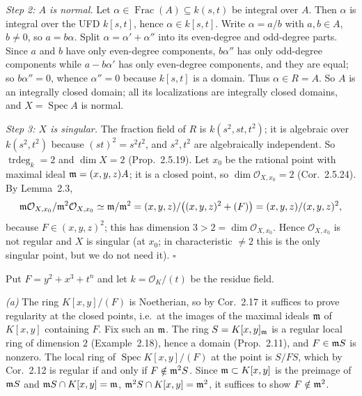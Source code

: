 \documentclass[11pt]{article}
\begin{document}
\emph{Step 2: $A$ is normal.} Let $\alpha\in\operatorname{Frac}(A)\subseteq k(s,t)$ be integral over $A$. Then $\alpha$ is integral over the UFD $k[s,t]$, hence $\alpha\in k[s,t]$. Write $\alpha=a/b$ with $a,b\in A$, $b\ne0$, so $a=b\alpha$. Split $\alpha=\alpha'+\alpha''$ into its even-degree and odd-degree parts. Since $a$ and $b$ have only even-degree components, $b\alpha''$ has only odd-degree components while $a-b\alpha'$ has only even-degree components, and they are equal; so $b\alpha''=0$, whence $\alpha''=0$ because $k[s,t]$ is a domain. Thus $\alpha\in R=A$. So $A$ is an integrally closed domain; all its localizations are integrally closed domains, and $X=\operatorname{Spec}A$ is normal.

\emph{Step 3: $X$ is singular.} The fraction field of $R$ is $k(s^2,st,t^2)$; it is algebraic over $k(s^2,t^2)$ because $(st)^2=s^2t^2$, and $s^2,t^2$ are algebraically independent. So $\operatorname{trdeg}_k=2$ and $\dim X=2$ (Prop.~2.5.19). Let $x_0$ be the rational point with maximal ideal $\mathfrak m=(x,y,z)A$; it is a closed point, so $\dim\mathcal O_{X,x_0}=2$ (Cor.~2.5.24). By Lemma~2.3,
\[ \mathfrak m\mathcal O_{X,x_0}/\mathfrak m^2\mathcal O_{X,x_0}\simeq\mathfrak m/\mathfrak m^2=(x,y,z)/\bigl((x,y,z)^2+(F)\bigr)=(x,y,z)/(x,y,z)^2, \]
because $F\in(x,y,z)^2$; this has dimension $3>2=\dim\mathcal O_{X,x_0}$. Hence $\mathcal O_{X,x_0}$ is not regular and $X$ is singular (at $x_0$; in characteristic $\neq2$ this is the only singular point, but we do not need it). \hfill$\square$

\pf
Put $F=y^2+x^3+t^n$ and let $k=\mathcal O_K/(t)$ be the residue field.

\emph{(a)} The ring $K[x,y]/(F)$ is Noetherian, so by Cor.~2.17 it suffices to prove regularity at the closed points, i.e.\ at the images of the maximal ideals $\mathfrak m$ of $K[x,y]$ containing $F$. Fix such an $\mathfrak m$. The ring $S=K[x,y]_\mathfrak m$ is a regular local ring of dimension $2$ (Example~2.18), hence a domain (Prop.~2.11), and $F\in\mathfrak m S$ is nonzero. The local ring of $\operatorname{Spec}K[x,y]/(F)$ at the point is $S/FS$, which by Cor.~2.12 is regular if and only if $F\notin\mathfrak m^2S$. Since $\mathfrak m\subset K[x,y]$ is the preimage of $\mathfrak m S$ and $\mathfrak m S\cap K[x,y]=\mathfrak m$, $\mathfrak m^2S\cap K[x,y]=\mathfrak m^2$, it suffices to show $F\notin\mathfrak m^2$.
\end{document}

